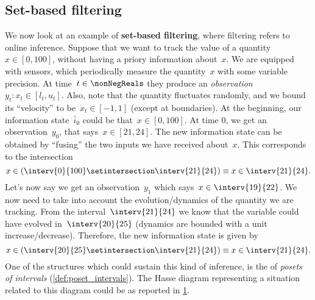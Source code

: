 \subsection{Set-based filtering}
We now look at an example of \textbf{set-based filtering}, where filtering refers to online inference.
Suppose that we want to track the value of a quantity~$x\in [0,100]$, without having a priory information about~$x$.
We are equipped with sensors, which periodically measure the quantity~$x$ with some variable precision.
At time~$t\in \nonNegReals $ they produce an \emph{observation}~$y_t\colon x_t\in [l_t,u_t]$.
Also, note that the quantity fluctuates randomly, and we bound its ``velocity'' to be~$\dot{x}_t\in [-1,1]$ (except at boundaries).
At the beginning, our information state~$\bar{i}_0$ could be that~$x\in [0,100]$.
At time 0, we get an observation~$y_0$, that says~$x\in [21,24]$.
The new information state can be obtained by ``fusing'' the two inputs we have received about~$x$.
This corresponds to the intersection
\begin{equation*}
    x\in \left( \interv{0}{100} \setintersection \interv{21}{24}\right)\equiv x\in \interv{21}{24}.
\end{equation*}
Let's now say we get an observation~$y_1$ which says~$x\in \interv{19}{22}$.
We now need to take into account the evolution/dynamics of the quantity we are tracking.
From the interval~$\interv{21}{24}$ we know that the variable could have evolved in~$\interv{20}{25}$ (dynamics are bounded with a unit increase/decrease).
Therefore, the new information state is given by
\begin{equation*}
    x\in \left( \interv{20}{25} \setintersection \interv{21}{24}\right)\equiv x\in \interv{21}{24}.
\end{equation*}
One of the structures which could sustain this kind of inference, is the of \emph{posets of intervals} (\cref{def:poset_intervals}).
The Hasse diagram representing a situation related to this diagram could be as reported in \cref{fig:hasse_filtering}.
\begin{figure}[h!]
    \centering
    \caption{}
    \label{fig:hasse_filtering}
\end{figure}

